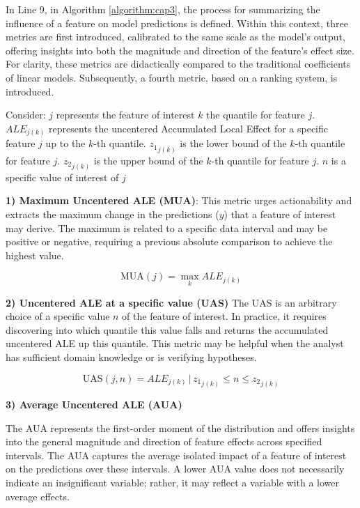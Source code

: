 In Line 9, in Algorithm \ref{algorithm:cap3}, the process for summarizing the influence of a feature on model predictions is defined. Within this context, three metrics are first introduced, calibrated to the same scale as the model's output, offering insights into both the magnitude and direction of the feature's effect size. For clarity, these metrics are didactically compared to the traditional coefficients of linear models. Subsequently, a fourth metric, based on a ranking system, is introduced.

Consider:
\( j \) represents the feature of interest
\( k \) the quantile for feature \( j \).
\( ALE_{j(k)} \) represents the uncentered Accumulated Local Effect for a specific feature \( j \) up to the \( k \)-th quantile.
\( {z_1}_{j(k)} \) is the lower bound of the \( k \)-th quantile for feature \( j \).
\( {z_2}_{j(k)} \) is the upper bound of the \( k \)-th quantile for feature \( j \).
\( n \) is a specific value of interest of \( j \) 

\textbf{1) Maximum Uncentered ALE (MUA)}: This metric urges actionability and extracts the maximum change in the predictions (\(y\)) that a feature of interest may derive. The maximum is related to a specific data interval and may be positive or negative, requiring a previous absolute comparison to achieve the highest value.


\begin{equation}
\label{eq:MUA}
\text{MUA}(j) = \max_{k} ALE_{j(k)}
\end{equation}


\textbf{2) Uncentered ALE at a specific value (UAS)}
The UAS is an arbitrary choice of a specific value \(n\) of the feature of interest. In practice, it requires discovering into which quantile this value falls and returns the accumulated uncentered ALE up this quantile. This metric may be helpful when the analyst has sufficient domain knowledge or is verifying hypotheses.

\begin{equation}
\label{eq:UAS}
\text{UAS}(j, n) = ALE_{j(k)} \, | \, {z_1}_{j(k)} \leq n \leq {z_2}_{j(k)}
\end{equation}

\textbf{3) Average Uncentered ALE (AUA)}

The AUA represents the first-order moment of the distribution and offers insights into the general magnitude and direction of feature effects across specified intervals. The AUA captures the average isolated impact of a feature of interest on the predictions over these intervals. A lower AUA value does not necessarily indicate an insignificant variable; rather, it may reflect a variable with a lower average effects. 

